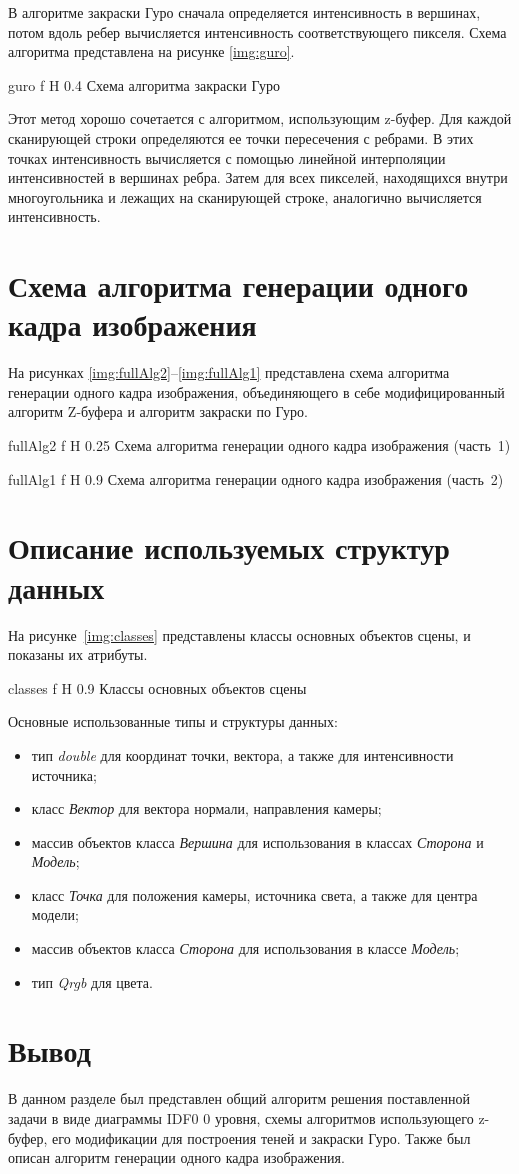 В алгоритме закраски Гуро сначала определяется интенсивность в вершинах, потом вдоль ребер вычисляется интенсивность соответствующего пикселя. Схема алгоритма представлена на рисунке \ref{img:guro}.

{guro} 
{f}
{H}
{0.4\textwidth} 
{Схема алгоритма закраски Гуро}

Этот метод хорошо сочетается с алгоритмом, использующим z-буфер. Для каждой сканирующей строки определяются ее точки пересечения с ребрами. В этих точках интенсивность вычисляется с помощью линейной интерполяции интенсивностей в вершинах ребра. Затем для всех пикселей, находящихся внутри многоугольника и лежащих на сканирующей строке, аналогично вычисляется интенсивность.

\section{Схема алгоритма генерации одного кадра изображения}

На рисунках \ref{img:fullAlg2}--\ref{img:fullAlg1} представлена схема алгоритма генерации одного кадра изображения, объединяющего в себе модифицированный алгоритм Z-буфера и алгоритм закраски по Гуро.

{fullAlg2} 
{f}
{H}
{0.25\textwidth} 
{Схема алгоритма генерации одного кадра изображения (часть~1)}

{fullAlg1} 
{f}
{H}
{0.9\textwidth} 
{Схема алгоритма генерации одного кадра изображения (часть~2)}

\section{Описание используемых структур данных}

На рисунке~\ref{img:classes} представлены классы основных объектов сцены, и показаны их атрибуты.

{classes} 
{f}
{H}
{0.9\textwidth} 
{Классы основных объектов сцены}

Основные использованные типы и структуры данных:
\begin{itemize}[label=---]
	\item тип \textit{double} для координат точки, вектора, а также для интенсивности источника;
	\item класс \textit{Вектор} для вектора нормали, направления камеры;
	\item массив объектов класса \textit{Вершина} для использования в классах \textit{Сторона} и \textit{Модель};
	\item класс \textit{Точка} для положения камеры, источника света, а также для центра модели;
	\item массив объектов класса \textit{Сторона} для использования в классе \textit{Модель};
	\item тип \textit{Qrgb} для цвета.
\end{itemize}

\section*{Вывод}

В данном разделе был представлен общий алгоритм решения поставленной задачи в виде диаграммы IDF0 0 уровня, схемы алгоритмов использующего z-буфер, его модификации для построения теней и закраски Гуро. Также был описан алгоритм генерации одного кадра изображения.